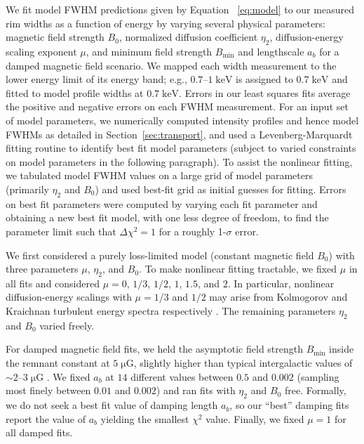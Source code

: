 \documentclass[iop, apj, numberedappendix]{emulateapj}
\newcommand*{\mt}{\mathrm}
\newcommand*{\unit}[1]{\;\mt{#1}}  %
\newcommand*{\abt}{\mathord{\sim}} %
\newcommand*{\Bmin}{B_{\mt{min}}}
\newcommand*{\muG}{\unit{\mu G}}
\begin{document}
We fit model FWHM predictions given by Equation~ \eqref{eq:model} to our
measured rim widths as a function of energy by varying several physical
parameters: magnetic field strength $B_0$, normalized diffusion coefficient
$\eta_2$, diffusion-energy scaling exponent $\mu$, and minimum field strength
$\Bmin$ and lengthscale $a_b$ for a damped magnetic field scenario.  We
mapped each width measurement to the lower energy limit of its energy band;
e.g., $0.7$--$1 \unit{keV}$ is assigned to $0.7 \unit{keV}$ and fitted to model
profile widths at $0.7 \unit{keV}$.  Errors in our least squares fits average
the positive and negative errors on each FWHM measurement.  For an input set of
model parameters, we numerically computed intensity profiles and hence model
FWHMs as detailed in Section~\ref{sec:transport}, and used a
Levenberg-Marquardt fitting routine to identify best fit model parameters
(subject to varied constraints on model parameters in the following paragraph).
To assist the nonlinear fitting, we tabulated model FWHM values on a large grid
of model parameters (primarily $\eta_2$ and $B_0$) and used best-fit grid as
initial guesses for fitting.
Errors on best fit parameters were computed by varying each fit parameter and
obtaining a new best fit model, with one less degree of freedom, to find the
parameter limit such that $\Delta \chi^2 = 1$ for a roughly 1-$\sigma$ error.

We first considered a purely loss-limited model (constant magnetic field
$B_0$) with three parameters $\mu$, $\eta_2$, and $B_0$.  To make nonlinear
fitting tractable, we fixed $\mu$ in all fits and considered $\mu = 0$, $1/3$,
$1/2$, $1$, $1.5$, and $2$.  In particular, nonlinear diffusion-energy
scalings with $\mu = 1/3$ and $1/2$ may arise from Kolmogorov and Kraichnan
turbulent energy spectra respectively \citep{reynolds2004}.  The remaining
parameters $\eta_2$ and $B_0$ varied freely.

For damped magnetic field fits, we held the asymptotic field strength
$\Bmin$ inside the remnant constant at $5 \muG$, slightly higher than
typical intergalactic values of $\abt 2$--$3 \muG$ \citep{lyne1989, han2006}.
We fixed $a_b$ at $14$ different values between $0.5$ and $0.002$ (sampling
most finely between $0.01$ and $0.002$) and ran fits with $\eta_2$ and $B_0$
free.  Formally, we do not seek a best fit value of damping length $a_b$, so
our ``best'' damping fits report the value of $a_b$ yielding the smallest
$\chi^2$ value.  Finally, we fixed $\mu = 1$ for all damped fits.
\end{document}
